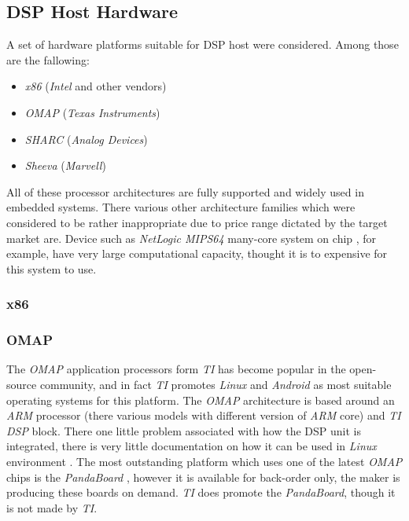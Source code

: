 
\subsection{DSP Host Hardware}

  A set of hardware platforms suitable for DSP host were considered.
 Among those are the fallowing:
 	\begin{itemize}
		\item \emph{x86} (\emph{Intel} and other vendors)
		\item \emph{OMAP} (\emph{Texas Instruments})
		\item \emph{SHARC} (\emph{Analog Devices})
		\item \emph{Sheeva} (\emph{Marvell})
	\end{itemize}
 All of these processor architectures are fully supported and widely
 used in embedded systems. There various other architecture families
 which were considered to be rather inappropriate due to price range
 dictated by the target market are. Device such as \emph{NetLogic
 MIPS64} many-core system on chip \cite{netlogic:mips64:multicore},
 for example, have very large computational capacity, thought it is
 to expensive for this system to use.

\subsubsection{x86}

\subsubsection{OMAP}

  The \emph{OMAP} application processors form \emph{TI} has become
 popular in the open-source community, and in fact \emph{TI} promotes
 \emph{Linux} and \emph{Android} as most suitable operating systems
 for this platform. The \emph{OMAP} architecture is based around
 an \emph{ARM} processor (there various models with different version
 of \emph{ARM} core) and \emph{TI DSP} block. There one little problem
 associated with how the DSP unit is integrated, there is very little
 documentation on how it can be used in \emph{Linux} environment
 \cite{ti:omap:wiki:dsp}. The most outstanding platform which uses
 one of the latest \emph{OMAP} chips is the \emph{PandaBoard}
 \cite{ti:omap:wiki:pb}, however it is available for back-order only,
 the maker is producing these boards on demand. \emph{TI} does
 promote the \emph{PandaBoard}, though it is not made by \emph{TI}.

